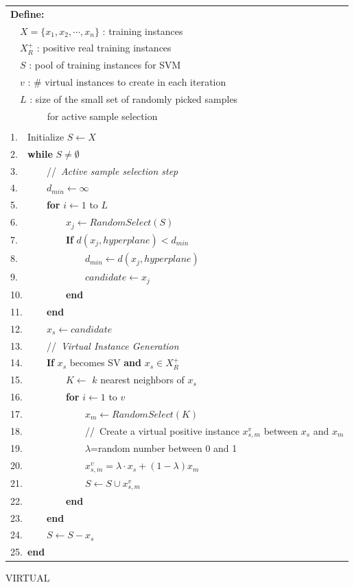 \begin{algo}[!b]
\begin{center} \small
\begin{tabular}{l}
{\bfseries Define:} \\
~~$X=\{x_1, x_2, \cdots, x_n\}$ : training instances \\
~~$X^+_{R}$ : positive real training instances\\
~~$S$ : pool of training instances for SVM\\
~~$v$ : \# virtual instances to create in each iteration\\
~~$L$ : size of the small set of randomly picked samples\\
~~~~~~~ for active sample selection\\
\hline
\\
1.~~Initialize $S \leftarrow X$\\
2.~~{\bfseries while} $S \neq \emptyset$\\
3.~~~~~~//~\textit{Active sample selection step}\\
4.~~~~~~$d_{min}\leftarrow \infty$\\
5.~~~~~~{\bfseries for} $i \leftarrow 1$ to $L$\\
6.~~~~~~~~~~$x_j \leftarrow RandomSelect(S)$\\
7.~~~~~~~~~~{\bfseries If} $d(x_j, hyperplane) < d_{min}$\\
8.~~~~~~~~~~~~~~$d_{min}\leftarrow d(x_j, hyperplane)$\\
9.~~~~~~~~~~~~~~$candidate \leftarrow x_j$\\
10.~~~~~~~~~{\bfseries end}\\
11.~~~~~{\bfseries end}\\
12.~~~~~$x_s \leftarrow candidate$\\
13.~~~~~//~\textit{Virtual Instance Generation}\\
14.~~~~~{\bfseries If} $x_s$ becomes SV {\bfseries and} $x_s \in X^+_{R}$\\
15.~~~~~~~~~$K \leftarrow$ $k$ nearest neighbors of $x_s$\\
16.~~~~~~~~~{\bfseries for} $i \leftarrow 1$ to $v$\\
17.~~~~~~~~~~~~~$x_m \leftarrow RandomSelect(K)$\\
18.~~~~~~~~~~~~~//~Create a virtual positive instance $x^v_{s,m}$ between $x_s$ and $x_m$ \\
19.~~~~~~~~~~~~~$\lambda$=random number between 0 and 1\\
20.~~~~~~~~~~~~~$x^v_{s,m} = \lambda \cdot x_s + (1-\lambda)x_m$\\
21.~~~~~~~~~~~~~$S \leftarrow S \cup x^v_{s,m}$\\
22.~~~~~~~~~{\bfseries end}\\
23.~~~~~{\bfseries end}\\
24.~~~~~$S \leftarrow S - x_s$\\
25.~{\bfseries end}
\vspace{-3mm}
\end{tabular}
\end{center}
\caption{VIRTUAL}
\label{algo_virtual}
\end{algo}

